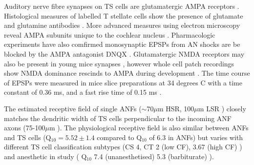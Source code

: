 
Auditory nerve fibre synapses on TS cells are glutamatergic AMPA receptors \citep{FerragamoGoldingEtAl:1998a,WentholdHunterEtAl:1993}.
Histological measures of labelled T stellate cells show the presence of glutamate and glutamine antibodies \citep{HackneyOsenEtAl:1990,WentholdHunterEtAl:1993}. 
More advanced measures using electron microscopy reveal AMPA subunits unique to the cochlear nucleus \citep{WangWentholdEtAl:1998}.
Pharmacologic experiments have also comfirmed monosynaptic EPSPs from AN shocks are be blocked by the AMPA antagonist DNQX \citep{FerragamoGoldingEtAl:1998a}.
Glutamatergic NMDA receptors may also be present in young mice synapses \citep{FerragamoGoldingEtAl:1998a}, however whole cell patch recordings show NMDA dominance rescinds to AMPA during development \citep{BellinghamLimEtAl:1998}.
The time course of EPSPs were measured in mice slice preparations at 34 degrees C with a time constant of 0.36 ms, and a fast rise time of 0.15 ms  \citep{GardnerTrussellEtAl:2001,Gardner:2000,GardnerTrussellEtAl:1999}.

The estimated receptive field of single ANFs ($\sim$70$\mu$m HSR, 100$\mu$m LSR  \citep{OertelWuEtAl:1990,Ryugo:2008,MeltzerRyugo:2006,RyugoParks:2003,Ryugo:1992,BrownBerglundEtAl:1988,RoullierCronin-SchreiberEtAl:1986,FeketeRouillerEtAl:1984}) closely matches the dendritic width of TS cells perpendicular to the incoming ANF axons  (75-100$\mu$m \citep[Mouse]{OertelWuEtAl:1990}). 
The physiological receptive field is also similar between ANFs and TS cells (Q$_{10}=5.52\pm1.4$  \citep[guinea pig]{JiangPalmerEtAl:1996} compared to Q$_{10}$ of 6.3 in ANFs) but varies with different TS cell classification subtypes (CS  4, CT  2 (low CF), 3.67 (high CF)  \citep[guinea pig]{PalmerWallaceEtAl:2003}) and anesthetic in study (%
Q$_{10}$ 7.4 (unanesthetised) 5.3 (barbiturate) \citep[cat][]{RhodeKettner:1987}).                      

